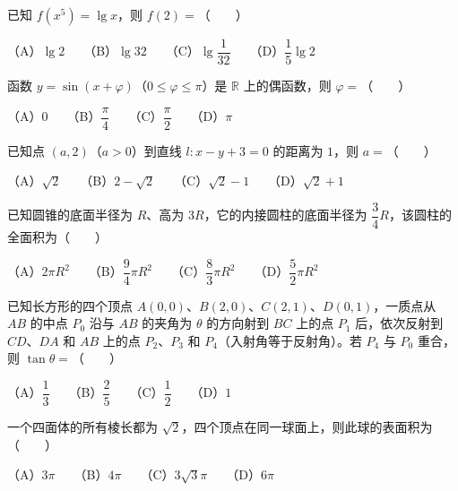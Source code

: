 \begin{question}
已知 $f(x^5)=\lg x$，则 $f(2)=$\mbox{（　　）}

（A）$\lg2$　　（B）$\lg32$　　（C）$\lg\dfrac1{32}$　　（D）$\dfrac15\lg2$

\end{question}
\begin{question}
函数 $y=\sin(x+\varphi)$（$0\leqslant\varphi\leqslant\pi$）是 $\mathbb R$ 上的偶函数，则 $\varphi=$\mbox{（　　）}

（A）$0$　　（B）$\dfrac\pi4$　　（C）$\dfrac\pi2$　　（D）$\pi$

\end{question}
\begin{question}
已知点 $(a,2)$（$a>0$）到直线 $l:x-y+3=0$ 的距离为 $1$，则 $a=$\mbox{（　　）}

（A）$\sqrt2$　　（B）$2-\sqrt2$　　（C）$\sqrt2-1$　　（D）$\sqrt2+1$

\end{question}
\begin{question}
已知圆锥的底面半径为 $R$、高为 $3R$，它的内接圆柱的底面半径为 $\dfrac34R$，该圆柱的全面积为\mbox{（　　）}

（A）$2\pi R^2$　　（B）$\dfrac94\pi R^2$　　（C）$\dfrac83\pi R^2$　　（D）$\dfrac52\pi R^2$

\end{question}
\begin{question}
已知长方形的四个顶点 $A(0,0)\text{、}B(2,0)\text{、}C(2,1)\text{、}D(0,1)$，一质点从 $AB$ 的中点 $P_0$ 沿与 $AB$ 的夹角为 $\theta$ 的方向射到 $BC$ 上的点 $P_1$ 后，依次反射到 $CD\text{、}DA$ 和 $AB$ 上的点 $P_2\text{、}P_3$ 和 $P_4$（入射角等于反射角）。若 $P_4$ 与 $P_0$ 重合，则 $\tan\theta=$\mbox{（　　）}

（A）$\dfrac13$　　（B）$\dfrac25$　　（C）$\dfrac12$　　（D）$1$

\end{question}
\begin{question}
一个四面体的所有棱长都为 $\sqrt2$，四个顶点在同一球面上，则此球的表面积为\mbox{（　　）}

（A）$3\pi$　　（B）$4\pi$　　（C）$3\sqrt3\pi$　　（D）$6\pi$

\end{question}

